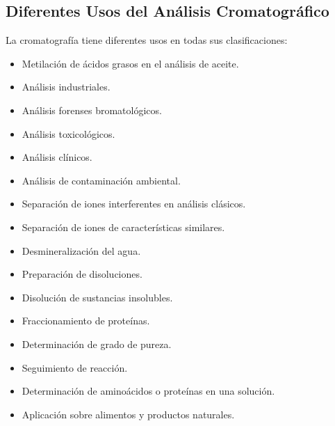 \subsection{Diferentes Usos del An\'alisis Cromatogr\'afico}
La cromatograf\'ia tiene diferentes usos en todas sus clasificaciones:
\begin{itemize}
	\item Metilaci\'on de \'acidos grasos en el an\'alisis de aceite.
	\item An\'alisis industriales.
	\item An\'alisis forenses bromatol\'ogicos.
	\item An\'alisis toxicol\'ogicos.
	\item An\'alisis cl\'inicos.
	\item An\'alisis de contaminaci\'on ambiental.
	\item Separaci\'on de iones interferentes en an\'alisis cl\'asicos.
	\item Separaci\'on de iones de caracter\'isticas  similares.
	\item Desmineralizaci\'on del agua.
	\item Preparaci\'on de disoluciones.
	\item Disoluci\'on de sustancias insolubles.
	\item Fraccionamiento de prote\'inas.
	\item Determinaci\'on de grado de pureza.
	\item Seguimiento de reacci\'on.
	\item Determinaci\'on de amino\'acidos o prote\'inas en una soluci\'on.
	\item Aplicaci\'on sobre alimentos y productos naturales.
\end{itemize}

